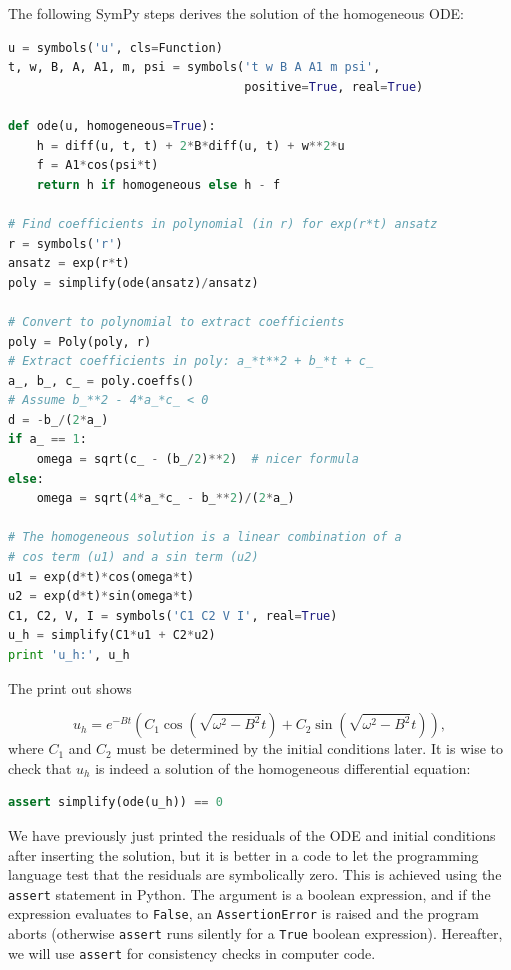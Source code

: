 \documentclass[graybox,envcountchap,sectrefs,final]{svmonodo}
\begin{document}
The following SymPy steps derives the solution of the homogeneous ODE:

\begin{lstlisting}[language=Python,style=graycolor]
u = symbols('u', cls=Function)
t, w, B, A, A1, m, psi = symbols('t w B A A1 m psi',
                                 positive=True, real=True)

def ode(u, homogeneous=True):
    h = diff(u, t, t) + 2*B*diff(u, t) + w**2*u
    f = A1*cos(psi*t)
    return h if homogeneous else h - f

# Find coefficients in polynomial (in r) for exp(r*t) ansatz
r = symbols('r')
ansatz = exp(r*t)
poly = simplify(ode(ansatz)/ansatz)

# Convert to polynomial to extract coefficients
poly = Poly(poly, r)
# Extract coefficients in poly: a_*t**2 + b_*t + c_
a_, b_, c_ = poly.coeffs()
# Assume b_**2 - 4*a_*c_ < 0
d = -b_/(2*a_)
if a_ == 1:
    omega = sqrt(c_ - (b_/2)**2)  # nicer formula
else:
    omega = sqrt(4*a_*c_ - b_**2)/(2*a_)

# The homogeneous solution is a linear combination of a
# cos term (u1) and a sin term (u2)
u1 = exp(d*t)*cos(omega*t)
u2 = exp(d*t)*sin(omega*t)
C1, C2, V, I = symbols('C1 C2 V I', real=True)
u_h = simplify(C1*u1 + C2*u2)
print 'u_h:', u_h
\end{lstlisting}
The print out shows

\[ u_h = e^{-Bt}\left(C_1 \cos(\sqrt{\omega^2 - B^2}t) +
C_2 \sin(\sqrt{\omega^2 - B^2}t)\right),\]
where $C_1$ and $C_2$ must be determined by the initial conditions later.
It is wise to check that $u_h$ is indeed a solution of the homogeneous
differential equation:


\begin{lstlisting}[language=Python,style=graycolor]
assert simplify(ode(u_h)) == 0
\end{lstlisting}
We have previously just printed the residuals of the ODE and initial
conditions after inserting the solution, but it is better in a code to
let the programming language test that the residuals are symbolically zero.
This is achieved using the \texttt{assert} statement in Python. The argument is
a boolean expression, and if the expression evaluates to \texttt{False},
an \texttt{AssertionError} is raised and the program aborts (otherwise \texttt{assert}
runs silently for a \texttt{True} boolean expression). Hereafter, we will use
\texttt{assert} for consistency checks in computer code.
\end{document}
